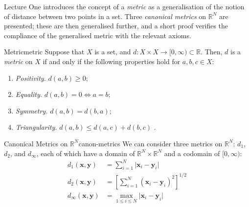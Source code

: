 \documentclass{article}
\renewcommand*\vec{\mathbf}
\numberwithin{equation}{section}
\numberwithin{enumi}{section}
\begin{document}
Lecture One introduces the concept of a \emph{metric} as a generalisation of the
notion of distance between two points in a set. Three \emph{canonical metrics}
on $\mathbb{R}^N$ are presented; these are then generalised further, and a short
proof verifies the compliance of the generalised metric with the relevant
axioms.
\begin{definition}{Metric}{metric}
    Suppose that $ X $ is a set, and $ d \colon X \times X \to [0, \infty)
    \subset \mathbb{R} $. Then, $ d $ is a \emph{metric} on $ X $ if and only if
    the following properties hold for $ a, b, c \in X $:
    \begin{enumerate}
        \item \emph{Positivity.} $ d(a, b) \geq 0 $;
        \item \emph{Equality.} $ d(a, b) = 0 \iff a = b $;
        \item \emph{Symmetry.} $ d(a, b) = d(b, a) $;
        \item \emph{Triangularity.} $ d(a, b) \leq d(a, c) + d(b, c) $
            \label{itm:triangle-inequality}.
    \end{enumerate}
\end{definition}
\begin{definition}{Canonical Metrics on \texorpdfstring{$\mathbb{R}^N$}{an
        N-dimensional real vector space}}{canon-metrics}
    We can consider three metrics on $ \mathbb{R}^N $: $ d_1 $, $ d_2 $, and
    $ d_\infty $, each of which have a domain of $ \mathbb{R}^N \times
    \mathbb{R}^N $ and a codomain of $ [0, \infty) $:
    \begin{align}
        d_1(\vec{x}, \vec{y}) &= \sum_{i=1}^N \vert \vec{x}_i - \vec{y}_i
            \vert \\
        d_2(\vec{x}, \vec{y}) &= \left[\sum_{i=1}^N (\vec{x}_i - \vec{y}_i)^2
            \right]^{1/2} \label{eqn:d2-metric} \\[.8em]
        d_\infty(\vec{x}, \vec{y}) &= \max_{1 \leq i \leq N} \vert \vec{x}_i -
            \vec{y}_i \vert
    \end{align}
\end{definition}
\end{document}
